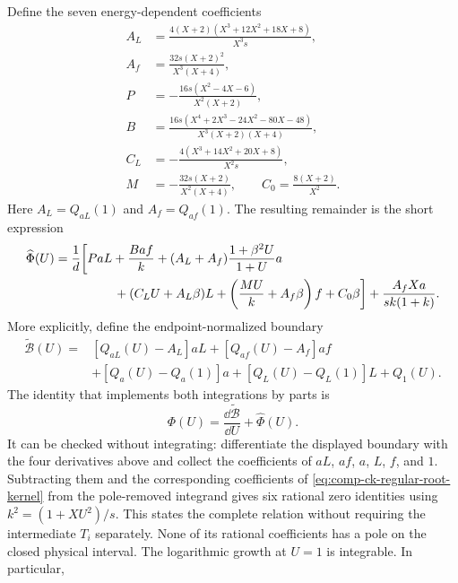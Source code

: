 Define the seven energy-dependent coefficients
\begin{align}
 A_L&=\frac{4(X+2)(X^3+12X^2+18X+8)}{X^3s},\\
 A_f&=\frac{32s(X+2)^2}{X^3(X+4)},\\
 P&=-\frac{16s(X^2-4X-6)}{X^2(X+2)},\\
 B&=\frac{16s(X^4+2X^3-24X^2-80X-48)}{X^3(X+2)(X+4)},\\
 C_L&=-\frac{4(X^3+14X^2+20X+8)}{X^2s},\\
 M&=-\frac{32s(X+2)}{X^2(X+4)},\qquad
 C_0=\frac{8(X+2)}{X^2}.
\end{align}
Here $A_L=Q_{aL}(1)$ and $A_f=Q_{af}(1)$.
The resulting remainder is the short expression
\begin{equation}
\begin{aligned}
 \widehat\Phi(U)={}&\frac1d\biggl[
 PaL+\frac{Baf}{k}
 +(A_L+A_f)\frac{1+\beta^2U}{1+U}a\\
 &\hspace{12mm}+(C_LU+A_L\beta)L
 +\left(\frac{MU}{k}+A_f\beta\right)f+C_0\beta\biggr]
 +\frac{A_fXa}{sk(1+k)}.
\end{aligned}
\label{eq:comp-ck-regular-root-kernel}
\end{equation}
More explicitly, define the endpoint-normalized boundary
\begin{equation}
\begin{aligned}
 \widetilde{\mathcal B}(U)={}&[Q_{aL}(U)-A_L]aL
                   +[Q_{af}(U)-A_f]af\\
 &+[Q_a(U)-Q_a(1)]a+[Q_L(U)-Q_L(1)]L+Q_1(U).
\end{aligned}
\end{equation}
The identity that implements both integrations by parts is
\begin{equation}
 \boxed{\Phi(U)=\frac{\dd\widetilde{\mathcal B}}{\dd U}
                    +\widehat\Phi(U).}
 \label{eq:comp-ck-normalized-kernel-identity}
\end{equation}
It can be checked without integrating: differentiate the displayed
boundary with the four derivatives above and collect the coefficients
of $aL$, $af$, $a$, $L$, $f$, and $1$. Subtracting them and the
corresponding coefficients of \eqref{eq:comp-ck-regular-root-kernel}
from the pole-removed integrand gives six rational zero identities
using $k^2=(1+XU^2)/s$. This states the complete relation without
requiring the intermediate $T_i$ separately.
None of its rational coefficients has a pole on the closed physical
interval. The logarithmic growth at $U=1$ is integrable. In particular,
